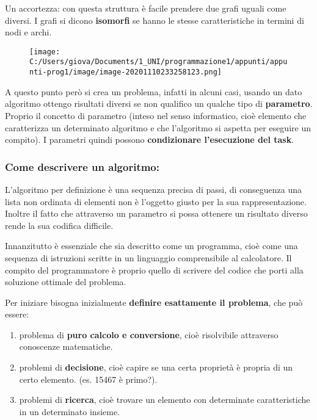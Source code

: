 \documentclass[
]{article}
\begin{document}
Un accortezza: con questa struttura è facile prendere due grafi uguali
come diversi. I grafi si dicono \textbf{isomorfi} se hanno le stesse
caratteristiche in termini di nodi e archi.

\begin{figure}
\centering
\texttt{[image: C:/Users/giova/Documents/1\_UNI/programmazione1/appunti/appunti-prog1/image/image-20201110233258123.png]}
\caption{}
\end{figure}

A questo punto però si crea un problema, infatti in alcuni casi, usando
un dato algoritmo ottengo risultati diversi se non qualifico un qualche
tipo di \textbf{parametro}. Proprio il concetto di parametro (inteso nel
senso informatico, cioè elemento che caratterizza un determinato
algoritmo e che l'algoritmo si aspetta per eseguire un compito). I
parametri quindi possono \textbf{condizionare l'esecuzione del task}.

\hypertarget{header-n32}{%
\subsubsection{Come descrivere un algoritmo:}\label{header-n32}}

L'algoritmo per definizione è una sequenza precisa di passi, di
conseguenza una lista non ordinata di elementi non è l'oggetto giusto
per la sua rappresentazione. Inoltre il fatto che attraverso un
parametro si possa ottenere un risultato diverso rende la sua codifica
difficile.

Innanzitutto è essenziale che sia descritto come un programma, cioè come
una sequenza di istruzioni scritte in un linguaggio comprensibile al
calcolatore. Il compito del programmatore è proprio quello di scrivere
del codice che porti alla soluzione ottimale del problema.

Per iniziare bisogna inizialmente \textbf{definire esattamente il
problema}, che può essere:

\begin{enumerate}
\def\labelenumi{\arabic{enumi}.}
\item
  problema di \textbf{puro calcolo e conversione}, cioè risolvibile
  attraverso conoscenze matematiche.
\item
  problemi di \textbf{decisione}, cioè capire se una certa proprietà è
  propria di un certo elemento. (es. 15467 è primo?).
\item
  problemi di \textbf{ricerca}, cioè trovare un elemento con determinate
  caratteristiche in un determinato insieme.
\end{enumerate}
\end{document}
